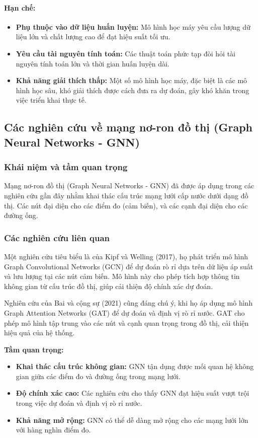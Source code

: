 \paragraph{Hạn chế:}
\begin{itemize}
    \item \textbf{Phụ thuộc vào dữ liệu huấn luyện:} Mô hình học máy yêu cầu lượng dữ liệu lớn và chất lượng cao để đạt hiệu suất tối ưu.
    \item \textbf{Yêu cầu tài nguyên tính toán:} Các thuật toán phức tạp đòi hỏi tài nguyên tính toán lớn và thời gian huấn luyện dài.
    \item \textbf{Khả năng giải thích thấp:} Một số mô hình học máy, đặc biệt là các mô hình học sâu, khó giải thích được cách đưa ra dự đoán, gây khó khăn trong việc triển khai thực tế.
\end{itemize}

\subsection{Các nghiên cứu về mạng nơ-ron đồ thị (Graph Neural Networks - GNN)}
\subsubsection{Khái niệm và tầm quan trọng}
Mạng nơ-ron đồ thị (Graph Neural Networks - GNN) đã được áp dụng trong các nghiên cứu gần đây nhằm khai thác cấu trúc mạng lưới cấp nước dưới dạng đồ thị. Các nút đại diện cho các điểm đo (cảm biến), và các cạnh đại diện cho các đường ống.

\subsubsection{Các nghiên cứu liên quan}
Một nghiên cứu tiêu biểu là của Kipf và Welling (2017), họ phát triển mô hình Graph Convolutional Networks (GCN) để dự đoán rò rỉ dựa trên dữ liệu áp suất và lưu lượng tại các nút cảm biến. Mô hình này cho phép tích hợp thông tin không gian từ cấu trúc đồ thị, giúp cải thiện độ chính xác dự đoán.

Nghiên cứu của Bai và cộng sự (2021) cũng đáng chú ý, khi họ áp dụng mô hình Graph Attention Networks (GAT) để dự đoán và định vị rò rỉ nước. GAT cho phép mô hình tập trung vào các nút và cạnh quan trọng trong đồ thị, cải thiện hiệu quả của hệ thống.

\textbf{Tầm quan trọng:}
\begin{itemize}
    \item \textbf{Khai thác cấu trúc không gian:} GNN tận dụng được mối quan hệ không gian giữa các điểm đo và đường ống trong mạng lưới.
    \item \textbf{Độ chính xác cao:} Các nghiên cứu cho thấy GNN đạt hiệu suất vượt trội trong việc dự đoán và định vị rò rỉ nước.
    \item \textbf{Khả năng mở rộng:} GNN có thể dễ dàng mở rộng cho các mạng lưới lớn với hàng nghìn điểm đo.
\end{itemize}

